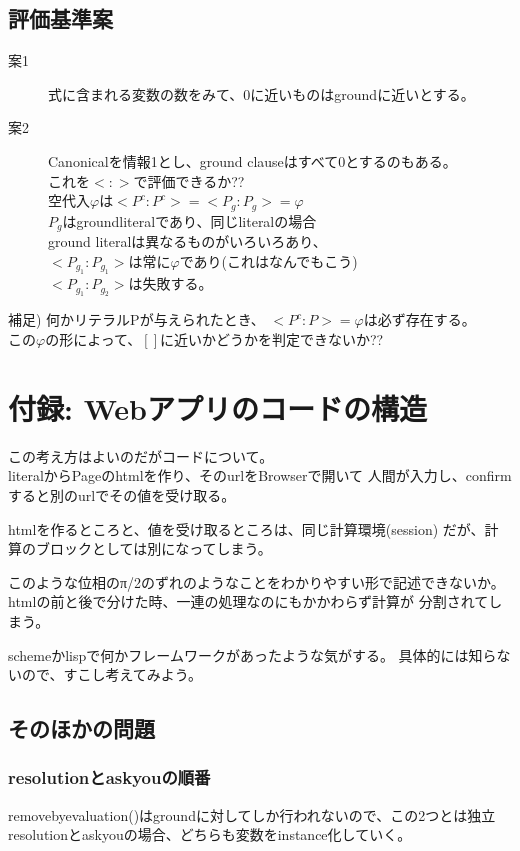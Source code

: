 \documentclass[10pt, onecolumn]{jarticle}   	%
\begin{document}
\subsection{評価基準案}
\begin{description}
\item[ 案1] 式に含まれる変数の数をみて、0に近いものはgroundに近いとする。
\item[ 案2] Canonicalを情報1とし、ground clauseはすべて0とするのもある。\\
    これを$<:>$で評価できるか??\\
    空代入$φ$は$<P^c:P^c>=<P_g:P_g>=φ$\\
$P_g$はgroundliteralであり、同じliteralの場合\\
ground literalは異なるものがいろいろあり、\\
    $<P_{g_1}:P_{g_1}>$は常に$φ$であり(これはなんでもこう)\\
    $<P_{g_1}:P_{g_2}>$は失敗する。\\
\end{description}

補足) 何かリテラルPが与えられたとき、
$<P^c:P> = φは必ず存在する。$\\
この$φ$の形によって、$[]$に近いかどうかを判定できないか??

\section{付録: Webアプリのコードの構造}
 この考え方はよいのだがコードについて。\\
 literalからPageのhtmlを作り、そのurlをBrowserで開いて
人間が入力し、confirmすると別のurlでその値を受け取る。

htmlを作るところと、値を受け取るところは、同じ計算環境(session)
だが、計算のブロックとしては別になってしまう。

このような位相のπ/2のずれのようなことをわかりやすい形で記述できないか。
htmlの前と後で分けた時、一連の処理なのにもかかわらず計算が
分割されてしまう。

schemeかlispで何かフレームワークがあったような気がする。
具体的には知らないので、すこし考えてみよう。

\subsection{そのほかの問題}

\subsubsection{resolutionとaskyouの順番}
  removebyevaluation()はgroundに対してしか行われないので、この2つとは独立
resolutionとaskyouの場合、どちらも変数をinstance化していく。
\end{document}
